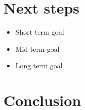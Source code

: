 \documentclass[
]{article}
\providecommand{\tightlist}{%
  \setlength{\itemsep}{0pt}\setlength{\parskip}{0pt}}
\begin{document}
\section{Next steps~~}\label{next-steps}

\begin{itemize}
\tightlist
\item
  Short term goal
\item
  Mid term goal
\item
  Long term goal
\end{itemize}

\section{Conclusion}\label{conclusion}
\end{document}
